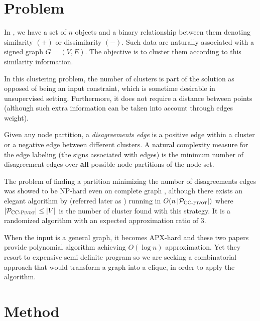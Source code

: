 \section{Problem}

In \pcc{}, we have a set of $n$ objects and a binary relationship between them
denoting similarity $(+)$  or dissimilarity $(-)$. Such data are naturally
associated with a signed graph $G=(V,E)$. The objective is to cluster them
according to this similarity information.

In this clustering problem, the number of clusters is part of the solution as
opposed of being an input constraint, which is sometime desirable in
unsupervised setting. Furthermore, it does not require a distance between
points (although such extra information can be taken into account through
edges weight).

Given any node partition, a \emph{disagreements edge} is a positive edge within a
cluster or a negative edge between different clusters. A natural complexity
measure for the edge labeling (the signs associated with edges) is the minimum
number of disagreement edges over \textbf{all} possible node partitions of the node
set.

The problem of finding a partition minimizing the number of disagreements
edges was showed to be NP-hard even on complete graph \autocite{Bansal2002},
although there exists an elegant algorithm by \textcite{Ailon2008} (referred
later as \ccp{}) running in $O(n\left|\mathcal{P}_{\text{\textsc{CC-Pivot}{}}}\right|)$
where $\left|\mathcal{P}_{\text{\textsc{CC-Pivot}{}}}\right| \le |V|$ is the number of
cluster found with this strategy. It is a randomized algorithm with an
expected approximation ratio of $3$.

When the input is a general graph, it becomes APX-hard
\autocites{Charikar2003}{Demaine2006} and these two papers provide polynomial
algorithm achieving $O(\log n)$ approximation. Yet they resort to expensive
semi definite program so we are seeking a combinatorial approach that would
transform a graph into a clique, in order to apply the \ccp{} algorithm.

\section{Method}


